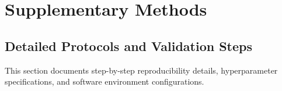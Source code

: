 \documentclass[letterpaper,11pt]{article}
\begin{document}
\section{Supplementary Methods}

\subsection{Detailed Protocols and Validation Steps}
This section documents step-by-step reproducibility details, hyperparameter specifications, and software environment configurations.



\end{document}
